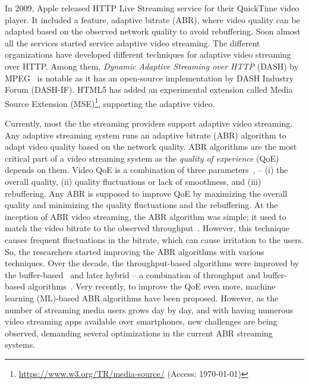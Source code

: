 In 2009, Apple released HTTP Live Streaming service for their QuickTime video player. It included a feature, adaptive bitrate (ABR), where video quality can be adapted based on the observed network quality to avoid rebuffering. Soon almost all the services started service adaptive video streaming. The different organizations have developed different techniques for adaptive video streaming over HTTP. Among them, \textit{Dynamic Adaptive Streaming over HTTP} (DASH) by MPEG~\cite{ISO/IEC23009-1:2019} is notable as it has an open-source implementation by DASH Industry Forum (DASH-IF). HTML5 has added an experimental extension called Media Source Extension (MSE)\footnote{\url{https://www.w3.org/TR/media-source/} (Access: \today)}, supporting the adaptive video. 


Currently, most the the streaming providers support adaptive video streaming. Any adaptive streaming system runs an adaptive bitrate (ABR) algorithm to adapt video quality based on the network quality. ABR algorithms are the most critical part of a video streaming system as the \textit{quality of experience} (QoE) depends on them. Video QoE is a combination of three parameters~\cite{yin2015control}, -- (i) the overall quality, (ii) quality fluctuations or lack of smoothness, and (iii) rebuffering. Any ABR is supposed to improve QoE by maximizing the overall quality and minimizing the quality fluctuations and the rebuffering. At the inception of ABR video streaming, the ABR algorithm was simple; it used to match the video bitrate to the observed throughput~\cite{5677508,10.1145/1943552.1943575,10.1145/1943552.1943574}. However, this technique causes frequent fluctuations in the bitrate, which can cause irritation to the users. So, the researchers started improving the ABR algorithms with various techniques. Over the decade, the throughput-based algorithms were improved by the buffer-based~\cite{Spiteri2016,10.1145/2910017.2910596,7393865} and later hybrid -- a combination of throughput and buffer-based algorithms~\cite{7247436,140405,yin2015control,10.1145/2670518.2673877}. Very recently, to improve the QoE even more, machine learning (ML)-based\cite{Mao2017,Akhtar2018,9155492} ABR algorithms have been proposed. However, as the number of streaming media users grows day by day, and with having numerous video streaming apps available over smartphones, new challenges are being observed, demanding several optimizations in the current ABR streaming systems. 

